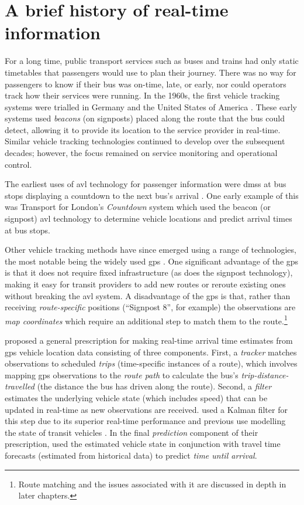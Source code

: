 \section{A brief history of real-time information}
\label{sec:literature}

For a long time, public transport services such as buses and trains had only static timetables that passengers would use to plan their journey. There was no way for passengers to know if their bus was on-time, late, or early, nor could operators track how their services were running. In the 1960s, the first vehicle tracking systems were trialled in Germany and the United States of America \citep{TCRP_1997}. These early systems used \emph{beacons} (on signposts) placed along the route that the bus could detect, allowing it to provide its location to the service provider in real-time. Similar vehicle tracking technologies continued to develop over the subsequent decades; however, the focus remained on service monitoring and operational control.


The earliest uses of \gls{avl} technology for passenger information were \glspl{dms} at bus stops displaying a countdown to the next bus's arrival \citep{TCRP_2003}. One early example of this was Transport for London's \emph{Countdown} system \citep{Balogh_1993} which used the beacon (or signpost) \gls{avl} technology to determine vehicle locations and predict arrival times at bus stops.


Other vehicle tracking methods have since emerged using a range of technologies, the most notable being the widely used \gls{gps} \citep{Zhao_1997}. One significant advantage of the \gls{gps} is that it does not require fixed infrastructure (as does the signpost technology), making it easy for transit providers to add new routes or reroute existing ones without breaking the \gls{avl} system. A disadvantage of the \gls{gps} is that, rather than receiving \emph{route-specific} positions (``Signpost 8'', for example) the observations are \emph{map coordinates} which require an additional step to match them to the route.\footnote{Route matching and the issues associated with it are discussed in depth in later chapters.}


\citet{Cathey_2003} proposed a general prescription for making real-time arrival time estimates from \gls{gps} vehicle location data consisting of three components. First, a \emph{tracker} matches observations to scheduled \emph{trips} (time-specific instances of a route), which involves mapping \gls{gps} observations to the \emph{route path} to calculate the bus's \emph{trip-distance-travelled} (the distance the bus has driven along the route). Second, a \emph{filter} estimates the underlying vehicle state (which includes speed) that can be updated in real-time as new observations are received.  used a Kalman filter for this step due to its superior real-time performance and previous use modelling the state of transit vehicles \citep{Wall_1999, Dailey_2001}. In the final \emph{prediction} component of their prescription, \citeauthor{Cathey_2003} used the estimated vehicle state in conjunction with travel time forecasts (estimated from historical data) to predict \emph{time until arrival}.


